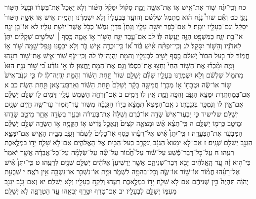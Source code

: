 \documentclass[twoside, openany, parskip=half, 11pt]{book}
\begin{document}
כח וְכִֽי־יִגַּ֨ח שׁ֥וֹר אֶת־אִ֛ישׁ א֥וֹ אֶת־אִשָּׁ֖ה וָמֵ֑ת סָק֨וֹל יִסָּקֵ֜ל הַשּׁ֗וֹר וְלֹ֤א יֵאָכֵל֙ אֶת־בְּשָׂר֔וֹ וּבַ֥עַל הַשּׁ֖וֹר נָקִֽי׃ כט וְאִ֡ם שׁוֹר֩ נַגָּ֨ח ה֜וּא מִתְּמֹ֣ל שִׁלְשֹׁ֗ם וְהוּעַ֤ד בִּבְעָלָיו֙ וְלֹ֣א יִשְׁמְרֶ֔נּוּ וְהֵמִ֥ית אִ֖ישׁ א֣וֹ אִשָּׁ֑ה הַשּׁוֹר֙ יִסָּקֵ֔ל וְגַם־בְּעָלָ֖יו יוּמָֽת׃ ל אִם־כֹּ֖פֶר יוּשַׁ֣ת עָלָ֑יו וְנָתַן֙ פִּדְיֹ֣ן נַפְשׁ֔וֹ כְּכֹ֥ל אֲשֶׁר־יוּשַׁ֖ת עָלָֽיו׃ לא אוֹ־בֵ֥ן יִגָּ֖ח אוֹ־בַ֣ת יִגָּ֑ח כַּמִּשְׁפָּ֥ט הַזֶּ֖ה יֵעָ֥שֶׂה לּֽוֹ׃ לב אִם־עֶ֛בֶד יִגַּ֥ח הַשּׁ֖וֹר א֣וֹ אָמָ֑ה כֶּ֣סֶף ׀ שְׁלֹשִׁ֣ים שְׁקָלִ֗ים יִתֵּן֙ לַֽאדֹנָ֔יו וְהַשּׁ֖וֹר יִסָּקֵֽל׃
לג וְכִֽי־יִפְתַּ֨ח אִ֜ישׁ בּ֗וֹר א֠וֹ כִּֽי־יִכְרֶ֥ה אִ֛ישׁ בֹּ֖ר וְלֹ֣א יְכַסֶּ֑נּוּ וְנָֽפַל־שָׁ֥מָּה שּׁ֖וֹר א֥וֹ חֲמֽוֹר׃ לד בַּ֤עַל הַבּוֹר֙ יְשַׁלֵּ֔ם כֶּ֖סֶף יָשִׁ֣יב לִבְעָלָ֑יו וְהַמֵּ֖ת יִֽהְיֶה־לּֽוֹ׃
לה וְכִֽי־יִגֹּ֧ף שֽׁוֹר־אִ֛ישׁ אֶת־שׁ֥וֹר רֵעֵ֖הוּ וָמֵ֑ת וּמָ֨כְר֜וּ אֶת־הַשּׁ֤וֹר הַחַי֙ וְחָצ֣וּ אֶת־כַּסְפּ֔וֹ וְגַ֥ם אֶת־הַמֵּ֖ת יֶֽחֱצֽוּן׃ לו א֣וֹ נוֹדַ֗ע כִּ֠י שׁ֣וֹר נַגָּ֥ח הוּא֙ מִתְּמ֣וֹל שִׁלְשֹׁ֔ם וְלֹ֥א יִשְׁמְרֶ֖נּוּ בְּעָלָ֑יו שַׁלֵּ֨ם יְשַׁלֵּ֥ם שׁוֹר֙ תַּ֣חַת הַשּׁ֔וֹר וְהַמֵּ֖ת יִֽהְיֶה־לּֽוֹ׃
לז כִּ֤י יִגְנֹֽב־אִישׁ֙ שׁ֣וֹר אוֹ־שֶׂ֔ה וּטְבָח֖וֹ א֣וֹ מְכָר֑וֹ חֲמִשָּׁ֣ה בָקָ֗ר יְשַׁלֵּם֙ תַּ֣חַת הַשּׁ֔וֹר וְאַרְבַּע־צֹ֖אן תַּ֥חַת הַשֶּֽׂה׃ כב א אִם־בַּמַּחְתֶּ֛רֶת יִמָּצֵ֥א הַגַּנָּ֖ב וְהֻכָּ֣ה וָמֵ֑ת אֵ֥ין ל֖וֹ דָּמִֽים׃ ב אִם־זָרְחָ֥ה הַשֶּׁ֛מֶשׁ עָלָ֖יו דָּמִ֣ים ל֑וֹ שַׁלֵּ֣ם יְשַׁלֵּ֔ם אִם־אֵ֣ין ל֔וֹ וְנִמְכַּ֖ר בִּגְנֵבָתֽוֹ׃ ג אִֽם־הִמָּצֵא֩ תִמָּצֵ֨א בְיָד֜וֹ הַגְּנֵבָ֗ה מִשּׁ֧וֹר עַד־חֲמ֛וֹר עַד־שֶׂ֖ה חַיִּ֑ים שְׁנַ֖יִם יְשַׁלֵּֽם׃
שלישיד כִּ֤י יַבְעֶר־אִישׁ֙ שָׂדֶ֣ה אוֹ־כֶ֔רֶם וְשִׁלַּח֙ אֶת־בְּעִירֹ֔ה וּבִעֵ֖ר בִּשְׂדֵ֣ה אַחֵ֑ר מֵיטַ֥ב שָׂדֵ֛הוּ וּמֵיטַ֥ב כַּרְמ֖וֹ יְשַׁלֵּֽם׃
ה כִּֽי־תֵצֵ֨א אֵ֜שׁ וּמָצְאָ֤ה קֹצִים֙ וְנֶאֱכַ֣ל גָּדִ֔ישׁ א֥וֹ הַקָּמָ֖ה א֣וֹ הַשָּׂדֶ֑ה שַׁלֵּ֣ם יְשַׁלֵּ֔ם הַמַּבְעִ֖ר אֶת־הַבְּעֵרָֽה׃
ו כִּֽי־יִתֵּן֩ אִ֨ישׁ אֶל־רֵעֵ֜הוּ כֶּ֤סֶף אֽוֹ־כֵלִים֙ לִשְׁמֹ֔ר וְגֻנַּ֖ב מִבֵּ֣ית הָאִ֑ישׁ אִם־יִמָּצֵ֥א הַגַּנָּ֖ב יְשַׁלֵּ֥ם שְׁנָֽיִם׃ ז אִם־לֹ֤א יִמָּצֵא֙ הַגַּנָּ֔ב וְנִקְרַ֥ב בַּֽעַל־הַבַּ֖יִת אֶל־הָֽאֱלֹהִ֑ים אִם־לֹ֥א שָׁלַ֛ח יָד֖וֹ בִּמְלֶ֥אכֶת רֵעֵֽהוּ׃ ח עַֽל־כׇּל־דְּבַר־פֶּ֡שַׁע עַל־שׁ֡וֹר עַל־חֲ֠מ֠וֹר עַל־שֶׂ֨ה עַל־שַׂלְמָ֜ה עַל־כׇּל־אֲבֵדָ֗ה אֲשֶׁ֤ר יֹאמַר֙ כִּי־ה֣וּא זֶ֔ה עַ֚ד הָֽאֱלֹהִ֔ים יָבֹ֖א דְּבַר־שְׁנֵיהֶ֑ם אֲשֶׁ֤ר יַרְשִׁיעֻן֙ אֱלֹהִ֔ים יְשַׁלֵּ֥ם שְׁנַ֖יִם לְרֵעֵֽהוּ׃
ט כִּֽי־יִתֵּן֩ אִ֨ישׁ אֶל־רֵעֵ֜הוּ חֲמ֨וֹר אוֹ־שׁ֥וֹר אוֹ־שֶׂ֛ה וְכׇל־בְּהֵמָ֖ה לִשְׁמֹ֑ר וּמֵ֛ת אוֹ־נִשְׁבַּ֥ר אוֹ־נִשְׁבָּ֖ה אֵ֥ין רֹאֶֽה׃ י שְׁבֻעַ֣ת יְהֹוָ֗ה תִּהְיֶה֙ בֵּ֣ין שְׁנֵיהֶ֔ם אִם־לֹ֥א שָׁלַ֛ח יָד֖וֹ בִּמְלֶ֣אכֶת רֵעֵ֑הוּ וְלָקַ֥ח בְּעָלָ֖יו וְלֹ֥א יְשַׁלֵּֽם׃ יא וְאִם־גָּנֹ֥ב יִגָּנֵ֖ב מֵעִמּ֑וֹ יְשַׁלֵּ֖ם לִבְעָלָֽיו׃ יב אִם־טָרֹ֥ף יִטָּרֵ֖ף יְבִאֵ֣הוּ עֵ֑ד הַטְּרֵפָ֖ה לֹ֥א יְשַׁלֵּֽם׃
\end{document}
